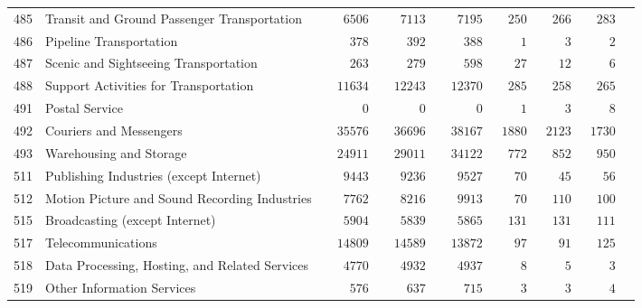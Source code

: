 \documentclass[9pt, oneside]{article}   	%
\begin{document}
\begin{longtable}{lp{3 in}ccccccc}
485  & Transit and Ground Passenger Transportation & $\phantom{000}6506$ & $\phantom{000}7113$ & $\phantom{000}7195$ & $\phantom{00}250$ & $\phantom{00}266$ & $\phantom{00}283$ \\
486  & Pipeline Transportation & $\phantom{0000}378$ & $\phantom{0000}392$ & $\phantom{0000}388$ & $\phantom{0000}1$ & $\phantom{0000}3$ & $\phantom{0000}2$ \\
487  & Scenic and Sightseeing Transportation & $\phantom{0000}263$ & $\phantom{0000}279$ & $\phantom{0000}598$ & $\phantom{000}27$ & $\phantom{000}12$ & $\phantom{0000}6$ \\
488  & Support Activities for Transportation & $\phantom{00}11634$ & $\phantom{00}12243$ & $\phantom{00}12370$ & $\phantom{00}285$ & $\phantom{00}258$ & $\phantom{00}265$ \\
491  & Postal Service & $\phantom{000000}0$ & $\phantom{000000}0$ & $\phantom{000000}0$ & $\phantom{0000}1$ & $\phantom{0000}3$ & $\phantom{0000}8$ \\
492  & Couriers and Messengers & $\phantom{00}35576$ & $\phantom{00}36696$ & $\phantom{00}38167$ & $\phantom{0}1880$ & $\phantom{0}2123$ & $\phantom{0}1730$ \\
493  & Warehousing and Storage & $\phantom{00}24911$ & $\phantom{00}29011$ & $\phantom{00}34122$ & $\phantom{00}772$ & $\phantom{00}852$ & $\phantom{00}950$ \\
511  & Publishing Industries (except Internet) & $\phantom{000}9443$ & $\phantom{000}9236$ & $\phantom{000}9527$ & $\phantom{000}70$ & $\phantom{000}45$ & $\phantom{000}56$ \\
512  & Motion Picture and Sound Recording Industries & $\phantom{000}7762$ & $\phantom{000}8216$ & $\phantom{000}9913$ & $\phantom{000}70$ & $\phantom{00}110$ & $\phantom{00}100$ \\
515  & Broadcasting (except Internet) & $\phantom{000}5904$ & $\phantom{000}5839$ & $\phantom{000}5865$ & $\phantom{00}131$ & $\phantom{00}131$ & $\phantom{00}111$ \\
517  & Telecommunications & $\phantom{00}14809$ & $\phantom{00}14589$ & $\phantom{00}13872$ & $\phantom{000}97$ & $\phantom{000}91$ & $\phantom{00}125$ \\
518  & Data Processing, Hosting, and Related Services & $\phantom{000}4770$ & $\phantom{000}4932$ & $\phantom{000}4937$ & $\phantom{0000}8$ & $\phantom{0000}5$ & $\phantom{0000}3$ \\
519  & Other Information Services & $\phantom{0000}576$ & $\phantom{0000}637$ & $\phantom{0000}715$ & $\phantom{0000}3$ & $\phantom{0000}3$ & $\phantom{0000}4$ \\

\end{longtable}
\end{document}
